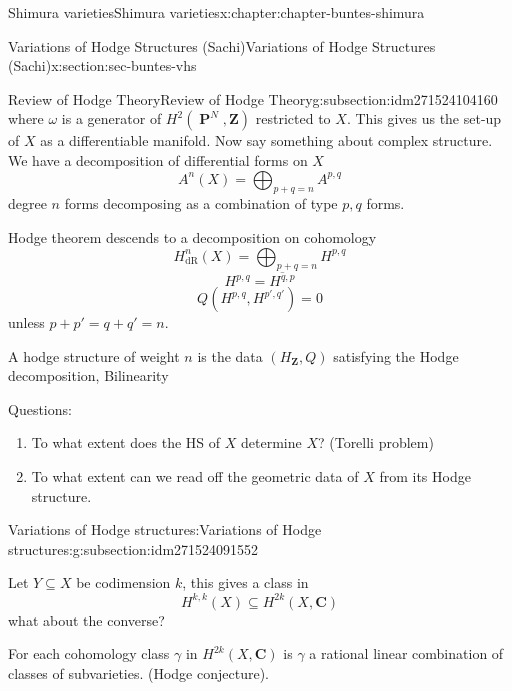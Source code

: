 \documentclass[oneside,10pt,]{book}
\numberwithin{equation}{section}
\newcommand{\ZZ}{\mathbf{Z}}
\newcommand{\CC}{\mathbf{C}}
\newcommand{\dR}{\mathrm{dR}}
\DeclareMathOperator{\PP}{\mathbf{P}}
\begin{document}
\begin{chapterptx}{Shimura varieties}{}{Shimura varieties}{}{}{x:chapter:chapter-buntes-shimura}
\begin{sectionptx}{Variations of Hodge Structures (Sachi)}{}{Variations of Hodge Structures (Sachi)}{}{}{x:section:sec-buntes-vhs}
\begin{subsectionptx}{Review of Hodge Theory}{}{Review of Hodge Theory}{}{}{g:subsection:idm271524104160}
\begin{equation*}
\end{equation*}
where \(\omega\) is a generator of \(H^2( \PP^N , \ZZ)\) restricted to \(X\). This gives us the set-up of \(X\) as a differentiable manifold. Now say something about complex structure. We have a decomposition of differential forms on \(X\)%
\begin{equation*}
A^n(X) = \bigoplus_{p+q  =n} A^{p,q}
\end{equation*}
degree \(n\) forms decomposing as a combination of type \(p,q\) forms.%
\par
Hodge theorem descends to a decomposition on cohomology%
\begin{equation*}
H^n_\dR(X) = \bigoplus_{p+q = n} H^{p,q}
\end{equation*}
%
\begin{equation*}
H^{p,q} = \overline{H^{q,p}}
\end{equation*}
%
\begin{equation*}
Q(H^{p,q}, H^{p',q'}) = 0
\end{equation*}
unless \(p+p' = q+q' = n\).%
\par
A hodge structure of weight \(n\) is the data \((H_\ZZ, Q)\) satisfying the Hodge decomposition, Bilinearity%
\par
Questions:%
\begin{enumerate}
\item{}To what extent does the HS of \(X\) determine \(X\)? (Torelli problem)%
\item{}To what extent can we read off the geometric data of \(X\) from its Hodge structure.%
\end{enumerate}
%
\end{subsectionptx}
%
%
\typeout{************************************************}
\typeout{************************************************}
%
\begin{subsectionptx}{Variations of Hodge structures:}{}{Variations of Hodge structures:}{}{}{g:subsection:idm271524091552}
\begin{introduction}{}%
Let \(Y \subseteq X\) be codimension \(k\), this gives a class in%
\begin{equation*}
H^{k,k}(X) \subseteq H^{2k}(X,\CC)
\end{equation*}
what about the converse?%
\par
For each cohomology class \(\gamma\)  in \(H^{2k} (X,\CC)\) is \(\gamma\) a rational linear combination of classes of subvarieties. (Hodge conjecture).%
\end{introduction}%

\end{subsectionptx}
\end{sectionptx}
\end{chapterptx}
\end{document}
